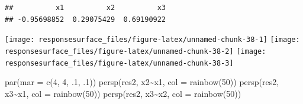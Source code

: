 \documentclass[
]{book}
\newenvironment{Shaded}{\begin{snugshade}}{\end{snugshade}}
\newcommand{\AttributeTok}[1]{\textcolor[rgb]{0.77,0.63,0.00}{#1}}
\newcommand{\CommentTok}[1]{\textcolor[rgb]{0.56,0.35,0.01}{\textit{#1}}}
\newcommand{\ConstantTok}[1]{\textcolor[rgb]{0.00,0.00,0.00}{#1}}
\newcommand{\DecValTok}[1]{\textcolor[rgb]{0.00,0.00,0.81}{#1}}
\newcommand{\FunctionTok}[1]{\textcolor[rgb]{0.00,0.00,0.00}{#1}}
\newcommand{\NormalTok}[1]{#1}
\newcommand{\SpecialCharTok}[1]{\textcolor[rgb]{0.00,0.00,0.00}{#1}}
\theoremstyle{definition}
\theoremstyle{definition}
\theoremstyle{definition}
\theoremstyle{definition}
\theoremstyle{remark}
\begin{document}
\begin{Shaded}
\end{Shaded}

\begin{verbatim}
##          x1          x2          x3 
## -0.95698852  0.29075429  0.69190922
\end{verbatim}

\begin{Shaded}
\end{Shaded}

\texttt{[image: responsesurface\_files/figure-latex/unnamed-chunk-38-1]} \texttt{[image: responsesurface\_files/figure-latex/unnamed-chunk-38-2]} \texttt{[image: responsesurface\_files/figure-latex/unnamed-chunk-38-3]}

\begin{Shaded}
\begin{Highlighting}[]
\FunctionTok{par}\NormalTok{(}\AttributeTok{mar =} \FunctionTok{c}\NormalTok{(}\DecValTok{4}\NormalTok{, }\DecValTok{4}\NormalTok{, .}\DecValTok{1}\NormalTok{, .}\DecValTok{1}\NormalTok{))}
\FunctionTok{persp}\NormalTok{(res2, x2}\SpecialCharTok{\textasciitilde{}}\NormalTok{x1, }\AttributeTok{col =} \FunctionTok{rainbow}\NormalTok{(}\DecValTok{50}\NormalTok{))}
\FunctionTok{persp}\NormalTok{(res2, x3}\SpecialCharTok{\textasciitilde{}}\NormalTok{x1, }\AttributeTok{col =} \FunctionTok{rainbow}\NormalTok{(}\DecValTok{50}\NormalTok{))}
\FunctionTok{persp}\NormalTok{(res2, x3}\SpecialCharTok{\textasciitilde{}}\NormalTok{x2, }\AttributeTok{col =} \FunctionTok{rainbow}\NormalTok{(}\DecValTok{50}\NormalTok{))}
\end{Highlighting}
\end{Shaded}
\end{document}

